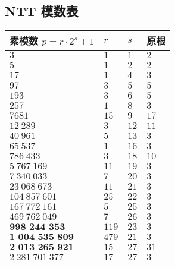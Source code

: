 \subsection{NTT 模数表}

\begin{tabular}{llll}
    \hline
    素模数 \(p=r\cdot 2^s+1\)      & \(r\)   & \(s\)  & 原根    \\
    \hline
    \(3\)                          & \(1\)   & \(1\)  & \(2\)  \\
    \(5\)                          & \(1\)   & \(2\)  & \(2\)  \\
    \(17\)                         & \(1\)   & \(4\)  & \(3\)  \\
    \(97\)                         & \(3\)   & \(5\)  & \(5\)  \\
    \(193\)                        & \(3\)   & \(6\)  & \(5\)  \\
    \(257\)                        & \(1\)   & \(8\)  & \(3\)  \\
    \(7681\)                       & \(15\)  & \(9\)  & \(17\) \\
    \(12~289\)                     & \(3\)   & \(12\) & \(11\) \\
    \(40~961\)                     & \(5\)   & \(13\) & \(3\)  \\
    \(65~537\)                     & \(1\)   & \(16\) & \(3\)  \\
    \(786~433\)                    & \(3\)   & \(18\) & \(10\) \\
    \(5~767~169\)                  & \(11\)  & \(19\) & \(3\)  \\
    \(7~340~033\)                  & \(7\)   & \(20\) & \(3\)  \\
    \(23~068~673\)                 & \(11\)  & \(21\) & \(3\)  \\
    \(104~857~601\)                & \(25\)  & \(22\) & \(3\)  \\
    \(167~772~161\)                & \(5\)   & \(25\) & \(3\)  \\
    \(469~762~049\)                & \(7\)   & \(26\) & \(3\)  \\
    \(\textbf{998~244~353}\)       & \(119\) & \(23\) & \(3\)  \\
    \(\textbf{1~004~535~809}\)     & \(479\) & \(21\) & \(3\)  \\
    \(\textbf{2~013~265~921}\)     & \(15\)  & \(27\) & \(31\) \\
    \(2~281~701~377\)              & \(17\)  & \(27\) & \(3\)  \\

\end{tabular}
